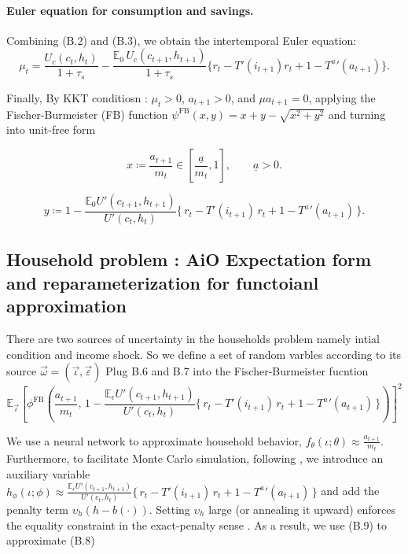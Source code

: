 \documentclass[11pt]{article}
\begin{document}
\paragraph{Euler equation for consumption and savings.}
Combining (B.2) and (B.3), we obtain the intertemporal Euler equation:
\begin{equation}
\mu_t 
= \frac{U_c(c_t,h_t)}{1+\tau_s}
- \frac{\mathbb{E}_0 \, U_c(c_{t+1},h_{t+1})}{1+\tau_s}
\Big\{ r_t - T'(i_{t+1})r_t + 1 - {T^a}'(a_{t+1}) \Big\}.
\end{equation}

Finally, By KKT conditiosn : $\mu_t>0$, $a_{t+1}>0$, and $\mu a_{t+1}=0$, applying the Fischer-Burmeister (FB) function $\psi^{\text{FB}}(x, y) = x+y-\sqrt{x^2+y^2} $ and turning into unit-free form 

\begin{equation}
x \coloneqq \frac{a_{t+1}}{m_t}\in [\frac{\underline{a}}{m_t}, 1], 
\qquad \underline{a} > 0.
\end{equation}

\begin{equation}
y \coloneqq 
1 - \frac{\mathbb{E}_0 U'(c_{t+1},h_{t+1})}{U'(c_t,h_t)}
\Big\{\, r_t - T'(i_{t+1})\,r_t + 1 - {T^a}'(a_{t+1}) \,\Big\}.
\end{equation}

\pagebreak

\subsection{Household problem : AiO Expectation form and reparameterization for functoianl approximation}
There are two sources of uncertainty in the households problem namely intial condition and income shock.
So we define a set of random varbles according to its source $\vec{\omega}=(\vec{\iota }, \vec{\varepsilon })$
Plug B.6 and B.7 into the Fischer-Burmeister fucntion
\begin{equation}
\mathbb{E}_{\vec{\iota}} \left[
\phi^{\text{FB}}\!\left(
\frac{a_{t+1}}{m_t},\,
1 - \frac{\mathbb{E}_{\epsilon} U'(c_{t+1},h_{t+1})}{U'(c_t,h_t)}\Big\{\, r_t - T'(i_{t+1})\,r_t + 1 - {T^a}'(a_{t+1}) \,\Big\}
\right)
\right]^{2}
\end{equation}

We use a neural network to approximate household behavior,
$f_\theta(\iota;\theta) \approx \frac{a_{t+1}}{m_t}$. Furthermore, to
facilitate Monte Carlo simulation, following \cite{FiaccoMcCormick1968},
we introduce an auxiliary variable $h_\phi(\iota;\phi) \approx \frac{\mathbb{E}_{\epsilon} U'(c_{t+1},h_{t+1})}{U'(c_t,h_t)}\Big\{\, r_t - T'(i_{t+1})\,r_t + 1 - {T^a}'(a_{t+1}) \,\Big\}$ and add the
penalty term $\upsilon_h\!\left(h - b(\cdot)\right)$. Setting $\upsilon_h$
large (or annealing it upward) enforces the equality constraint in the
exact-penalty sense \cite{nocedal2006numerical}. As a result, we use (B.9) to approximate (B.8)
\end{document}

